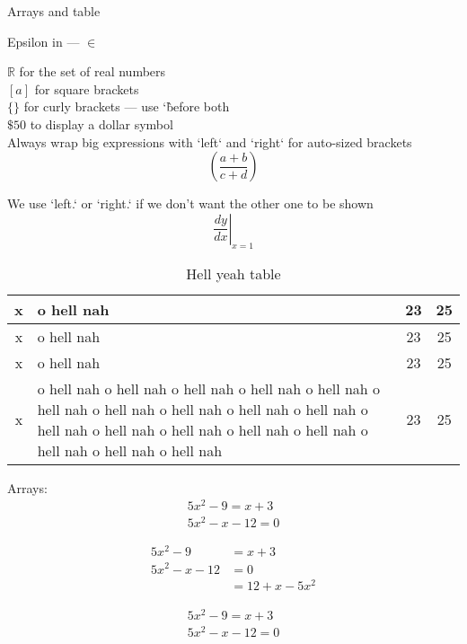 \documentclass[11pt]{article}
\begin{document}
Arrays and table

Epsilon in --- $\in$

$\mathbb{R}$ for the set of real numbers\\

$[a]$ for square brackets\\

$\{ \}$ for curly brackets — use `\` before both\\

$\$50$ to display a dollar symbol\\

Always wrap big expressions with `left` and `right` for auto-sized brackets\\

\[
\left( \frac{a + b}{c + d} \right)
\]

We use `left.` or `right.` if we don't want the other one to be shown\\

\[
\left. \frac{dy}{dx} \right|_{x=1}
\]

\begin{table}[H]
\centering %
\caption{Hell yeah table}
\def\arraystretch{1.2}  
\begin{tabular}{|c|p{11cm}|c|c|} \hline %
x & o hell nah & 23 & 25 \\ \hline
x & o hell nah & 23 & 25 \\ \hline
x & o hell nah & 23 & 25 \\ \hline %
x & o hell nah o hell nah o hell nah o hell nah o hell nah o hell nah o hell nah o hell nah o hell nah o hell nah o hell nah o hell nah o hell nah o hell nah o hell nah o hell nah o hell nah o hell nah  & 23 & 25 \\ \hline %
\end{tabular}
\end{table}


Arrays:
\begin{align}
5x^2-9=x+3\\
5x^2-x-12=0
\end{align}


\begin{align*}
5x^2-9&=x+3\\
5x^2-x-12&=0\\
&=12+x-5x^2
\end{align*}


\begin{align}
5x^2-9=x+3\\
5x^2-x-12=0
\end{align}
\end{document}
